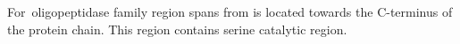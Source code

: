For~\texitProlyl oligopeptidase family region spans from is located towards the C-terminus of the protein chain. This region contains serine catalytic region.  